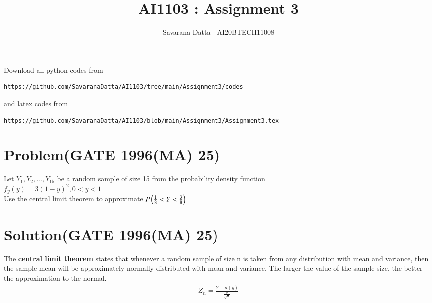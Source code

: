 \documentclass[journal,12pt,twocolumn]{IEEEtran}
\begin{document}
     \def\rightbox#1{\makebox[0in][r]{#1}}
     \def\centbox#1{\makebox[0in]{#1}}
     \def\topbox#1{\raisebox{-\baselineskip}[0in][0in]{#1}}
     \def\midbox#1{\raisebox{-0.5\baselineskip}[0in][0in]{#1}}
\vspace{3cm}
\title{AI1103 : Assignment 3}
\author{Savarana Datta - AI20BTECH11008}
\maketitle
\newpage
\bigskip
\renewcommand{\thefigure}{\theenumi}
\renewcommand{\thetable}{\theenumi}
Download all python codes from 
\begin{lstlisting}
https://github.com/SavaranaDatta/AI1103/tree/main/Assignment3/codes
\end{lstlisting}
%
and latex codes from 
%
\begin{lstlisting}
https://github.com/SavaranaDatta/AI1103/blob/main/Assignment3/Assignment3.tex
\end{lstlisting}


\section*{Problem(GATE 1996(MA) 25)}
Let $Y_{1},Y_{2},...,Y_{15}$ be a random sample of size 15 from the probability density function \\
$f_{y}(y)=3(1-y)^{2} , 0<y<1$\\
Use the central limit theorem to approximate $P\left(\frac{1}{8}<\Bar{Y}<\frac{3}{8}\right)$

\section*{Solution(GATE 1996(MA) 25)}
The \textbf{central limit theorem} states that whenever a random sample of size n is taken from any distribution with mean and variance, then the sample mean will be approximately normally distributed with mean and variance. The larger the value of the sample size, the better the approximation to the normal.
\begin{align}
\tag{1.1}
    Z_{n}=\frac{\bar{Y}-\mu(y)}{\frac{\sigma}{\sqrt{n}}}
    \label{eq:1}
\end{align}
\end{document}
